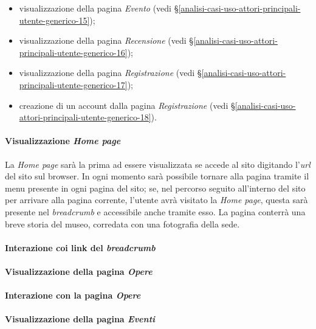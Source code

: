 \begin{itemize}
	\item visualizzazione della pagina \textit{Evento} (vedi §\ref{analisi-casi-uso-attori-principali-utente-generico-15});
	\item visualizzazione della pagina \textit{Recensione} (vedi §\ref{analisi-casi-uso-attori-principali-utente-generico-16});
	\item visualizzazione della pagina \textit{Registrazione} (vedi §\ref{analisi-casi-uso-attori-principali-utente-generico-17});
	\item creazione di un account dalla pagina \textit{Registrazione} (vedi §\ref{analisi-casi-uso-attori-principali-utente-generico-18}).
\end{itemize}

\paragraph{Visualizzazione \textit{Home page}}
\label{analisi-casi-uso-attori-principali-utente-generico-1}
La \textit{Home page} sarà la prima ad essere visualizzata se accede al sito digitando l'\textit{url} del sito sul browser. In ogni momento sarà possibile tornare alla pagina tramite il menu presente in ogni pagina del sito; se, nel percorso seguito all'interno del sito per arrivare alla pagina corrente, l'utente avrà visitato la \textit{Home page}, questa sarà presente nel \textit{breadcrumb} e accessibile anche tramite esso. La pagina conterrà una breve storia del museo, corredata con una fotografia della sede.

\paragraph{Interazione coi link del \textit{breadcrumb}}
\label{analisi-casi-uso-attori-principali-utente-generico-2}


\paragraph{Visualizzazione della pagina \textit{Opere}}
\label{analisi-casi-uso-attori-principali-utente-generico-3}

\paragraph{Interazione con la pagina \textit{Opere}}
\label{analisi-casi-uso-attori-principali-utente-generico-4}

\paragraph{Visualizzazione della pagina \textit{Eventi}}
\label{analisi-casi-uso-attori-principali-utente-generico-5}

